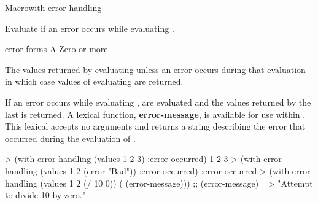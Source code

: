 \documentclass[10pt,twoside,english,pdftex]{article}
\begin{document}
\begin{functiondoc}{Macro}{with-error-handling}{ 
    \superstar{} \returns{} \superstar} 
%
%
%  
\fnsyntax

\fnpurpose Evaluate  if an error occurs while evaluating
. 

\fnpackage {}

\fnmodule {}

\fnargs
\begin{args}{error-forms}
\arg[form] A 
 Zero or more 
\end{args}

\fnreturns The values returned by evaluating  unless an
error occurs during that evaluation in which case values of evaluating 
 are returned.

\fndescription If an error occurs while evaluating ,
 are evaluated and the values returned by the last
 is returned.  A lexical function, \textbf{error-message},
is available for use within .  This lexical  accepts
no arguments and returns a string describing the error that occurred during
the evaluation of .

%
\fnexamples
\begin{example}
> (with-error-handling (values 1 2 3) :error-occurred)
1
2
3
> (with-error-handling (values 1 2 (error "Bad")) :error-occurred)
:error-occurred
> (with-error-handling (values 1 2 (/ 10 0)) ( (error-message)))
;;  (error-message) => "Attempt to divide 10 by zero."
\end{example}

\end{functiondoc}

\end{document}
